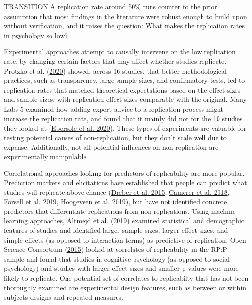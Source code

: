 \documentclass[
  english,
  a4paper,
]{article}
\begin{document}
TRANSITION A replication rate around 50\% runs counter to the prior assumption that most findings in the literature were robust enough to build upon without verification, and it raises the question: What makes the replication rates in psychology so low?

Experimental approaches attempt to causally intervene on the low replication rate, by changing certain factors that may affect whether studies replicate. Protzko et al. (\protect\hyperlink{ref-protzko2020}{2020}) showed, across 16 studies, that better methodological practices, such as transparency, large sample sizes, and confirmatory tests, led to replication rates that matched theoretical expectations based on the effect sizes and sample sizes, with replication effect sizes comparable with the original. Many Labs 5 examined how adding expert advice to a replication process might increase the replication rate, and found that it mainly did not for the 10 studies they looked at (\protect\hyperlink{ref-ebersole2020}{Ebersole et al. 2020}). These types of experiments are valuable for testing potential causes of non-replication, but they don't scale well due to expense. Additionally, not all potential influences on non-replication are experimentally manipulable.

Correlational approaches looking for predictors of replicability are more popular. Prediction markets and elicitations have established that people can predict what studies will replicate above chance (\protect\hyperlink{ref-dreber2015}{Dreber et al. 2015}, \protect\hyperlink{ref-camerer2018}{Camerer et al. 2018}, \protect\hyperlink{ref-forsell2019}{Forsell et al. 2019}, \protect\hyperlink{ref-hoogeveen2019}{Hoogeveen et al. 2019}), but have not identified concrete predictors that differentiate replications from non-replications. Using machine learning approaches, Altmejd et al. (\protect\hyperlink{ref-altmejd2019}{2019}) examined statistical and demographic features of studies and identified larger sample sizes, larger effect sizes, and simple effects (as opposed to interaction terms) as predictive of replication. Open Science Consortium (\protect\hyperlink{ref-openscienceconsortium2015}{2015}) looked at correlates of replicability in the RP:P sample and found that studies in cognitive psychology (as opposed to social psychology) and studies with larger effect sizes and smaller p-values were more likely to replicate. One potential set of correlates to replicabilty that has not been thoroughly examined are experimental design features, such as between or within subjects designs and repeated measures.
\end{document}
